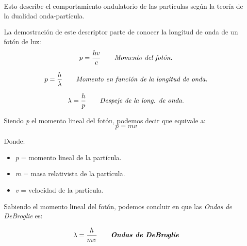 \documentclass[a4paper]{article}
\begin{document}
        \indent Esto describe el comportamiento ondulatorio de las partículas según la teoría de la dualidad onda-partícula. 

        \indent La demostración de este descriptor parte de conocer la longitud de onda de un fotón de luz: \\

        \begin{equation}
            p = \frac {hv} {c} \tag*{\textit{Momento del fotón.}}  \\
        \end{equation}

        \begin{equation}
            p = \frac {h} {\lambda} \tag*{\textit{Momento en función de la longitud de onda.}} \\
        \end{equation}

        \begin{equation}
            \lambda = \frac {h} {p} \tag*{\textit{Despeje de la long. de onda.}} \\
        \end{equation}

        \indent Siendo \textit{p} el momento lineal del fotón, podemos decir que equivale a: \\

        \begin{equation}
            p = m v \tag*{}
        \end{equation}

        \indent Donde: \\
        \begin{itemize} [itemsep = -1.5em, topsep = 0em, leftmargin = 1cm]
            \item \textit{p} = momento lineal de la partícula. \\
            \item \textit{m} = masa relativista de la partícula. \\
            \item \textit{v} = velocidad de la partícula. \\
        \end{itemize}

        \indent Sabiendo el momento lineal del fotón, podemos concluir en que las \textit{Ondas de DeBroglie} es:

        \begin{equation}
        \lambda = \frac {h} {mv} \tag*{\textit{\textbf{Ondas de DeBroglie}}} \\
        \end{equation}
\end{document}
